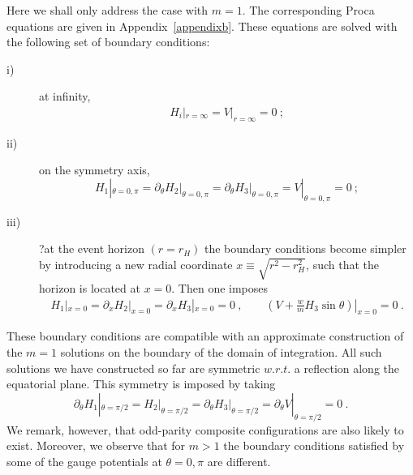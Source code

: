 Here we shall only address the case with $m=1$. The corresponding Proca equations are given in Appendix~\ref{appendixb}. These equations are solved with the following set of boundary conditions:
\begin{description}
%
\item[i)] at infinity, 
\begin{eqnarray}
  H_i|_{r=\infty}=V|_{r=\infty}=0\ ;
  \label{bccloudslarge}
\end{eqnarray}
\item[ii)] on the symmetry axis, 
%
\begin{equation}
H_1|_{\theta=0,\pi}
 = \partial_\theta H_2\big|_{\theta=0,\pi}=\partial_\theta H_3\big|_{\theta=0,\pi}=V|_{\theta=0,\pi}=0 \ ;
 \label{bccloudsaxis}
\end{equation}
\item[iii)]?at the event horizon $(r=r_H)$ the boundary conditions become simpler by introducing a new radial coordinate $x\equiv \sqrt{r^2-r_H^2}$, such that the horizon is located at $x=0$.
Then one imposes
\begin{eqnarray}
 H_1|_{x=0}=\partial_x H_2|_{x=0}=\partial_x H_3|_{x=0}= 0 \ , \qquad  \left(V+\frac{w}{m}H_3\sin\theta\right)|_{x=0}=0  
\label{bccloudshorizon} \ . 
\end{eqnarray}
\end{description}
%
These boundary conditions are compatible with an approximate construction of the $m=1$ solutions
on the boundary of the domain of integration. 
%
All such solutions we have constructed so far are symmetric $w.r.t.$ a reflection along the equatorial plane. This symmetry is imposed by taking
 \begin{equation}
 \partial_\theta H_1|_{\theta=\pi/2}=
  H_2\big|_{\theta=\pi/2}=\partial_\theta H_3\big|_{\theta=\pi/2}= \partial_\theta  V|_{\theta=\pi/2}=0\ .
\end{equation}
We remark, however, that odd-parity composite configurations are also likely to exist.
%
Moreover, we observe that for $m>1$ the boundary conditions satisfied 
by some of the gauge potentials
at $\theta=0,\pi$ are different.


